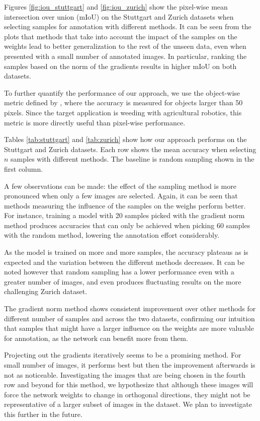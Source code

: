 \documentclass[letterpaper, 10 pt, conference]{ieeeconf}  %
\begin{document}
Figures \ref{fig:iou_stuttgart} and \ref{fig:iou_zurich} show the pixel-wise mean intersection over union (mIoU) on the Stuttgart and Zurich datasets when selecting samples for annotation with different methods. It can be seen from the plots that methods that take into account the impact of the samples on the weights lead to better generalization to the rest of the unseen data, even when presented with a small number of annotated images. In particular, ranking the samples based on the norm of the gradients results in higher mIoU on both datasets.

To further quantify the performance of our approach, we use the object-wise metric defined by \cite{milioto2018real}, where the accuracy is measured for objects larger than 50 pixels. Since the target application is weeding with agricultural robotics, this metric is more directly useful than pixel-wise performance.  


Tables \ref{tab:stuttgart} and \ref{tab:zurich} show how our approach performs on the Stuttgart and Zurich datasets. Each row shows the mean accuracy when selecting $n$ samples with different methods. The baseline is random sampling shown in the first column.


A few observations can be made: the effect of the sampling method is more pronounced when only a few images are selected. Again, it can be seen that methods measuring the influence of the samples on the weighs perform better. For instance, training a model with 20 samples picked with the gradient norm method produces accuracies that can only be achieved when picking 60 samples with the random method, lowering the annotation effort considerably.

As the model is trained on more and more samples, the accuracy plateaus as is expected and the variation between the different methods decreases. It can be noted however that random sampling has a lower performance even with a greater number of images, and even produces fluctuating results on the more challenging Zurich dataset.

The gradient norm method shows consistent improvement over other methods for different number of samples and across the two datasets, confirming our intuition that samples that might have a larger influence on the weights are more valuable for annotation, as the network can benefit more from them.

Projecting out the gradients iteratively seems to be a promising method. For small number of images, it performs best but then the improvement afterwards is not as noticeable. Investigating the images that are being chosen in the fourth row and beyond for this method, we hypothesize that although these images will force the network weights to change in orthogonal directions, they might not be representative of a larger subset of images in the dataset. We plan to investigate this further in the future. 
\end{document}
